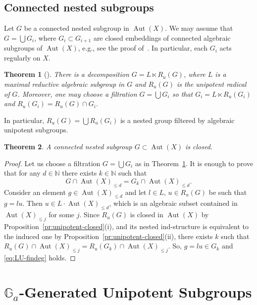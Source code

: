 \documentclass[12pt,a4paper]{amsart}
\theoremstyle{plain}
\newtheorem{theorem}{Theorem}[section]
\theoremstyle{definition}
\theoremstyle{remark}
\def\Aut{\operatorname{Aut}}
\def\NN{{\mathbb N}}
\def\G{{\mathbb G}}
\begin{document}
\subsection{Connected nested subgroups}
Let $G$ be a connected nested subgroup in $\Aut(X)$.
   We may assume that $G=\bigcup G_i$, where $G_i\subset G_{i+1}$ are closed embeddings of connected algebraic subgroups of $\Aut(X)$, e.g., see the proof of~\cite[Proposition~1.6.2]{FK}. 
   In particular, each $G_i$ acts regularly on $X$.
   
   \begin{theorem}[{\cite[Section 2.2]{KPZ}}]\label{th:LU}
   There is a decomposition $G = L\ltimes R_u(G)$, where $L$ is a maximal reductive algebraic subgroup in $G$ and $R_u(G)$ is the unipotent radical of $G$. Moreover, one may choose a filtration $G=\bigcup G_i$ so that $G_i=L\ltimes R_u(G_i)$ and $R_u(G_i)=R_u(G)\cap G_i$.
   \end{theorem}
   
   In particular, $R_u(G)=\bigcup R_u(G_i)$ is a nested group filtered by algebraic unipotent subgroups. 
   
   \begin{theorem}\label{th:nested-closed}
      A connected nested subgroup $G\subset\Aut(X)$ is closed.
   \end{theorem}
   \begin{proof}
      Let us choose a filtration $G=\bigcup G_i$ as in Theorem~\ref{th:LU}.
   It is enough to prove that for any $d\in\NN$ there exists $k\in\NN$ such that
   \begin{equation}\label{eq:LU-findeg}
   G\cap \Aut(X)_{\le d}=G_k\cap \Aut(X)_{\le d}.
   \end{equation}
   Consider an element $g\in \Aut(X)_{\le d}$ and let $l\in L$, $u\in R_u(G)$ be such that $g=lu$. 
   Then $u\in L\cdot\Aut(X)_{\le d}$, which is an algebraic subset contained in $\Aut(X)_{\le j}$ for some $j$.
   Since $R_u(G)$ is closed in $\Aut(X)$ by Proposition~\ref{pr:unipotent-closed}(i), 
   and its nested ind-structure is equivalent to the induced one by Proposition~\ref{pr:unipotent-closed}(ii),
    there exists $k$ such that $R_u(G)\cap\Aut(X)_{\le j}=R_u(G_k)\cap\Aut(X)_{\le j}$. 
   So, $g=lu\in G_k$ and \eqref{eq:LU-findeg} holds.
   \end{proof}
   


\section{$\G_a$-Generated Unipotent Subgroups}\label{sec:non-nested}
\end{document}
